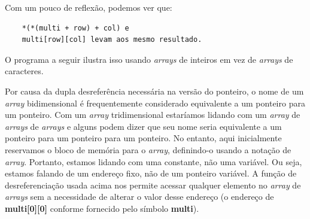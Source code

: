 Com um pouco de reflexão, podemos ver que:
\begin{lstlisting}
	*(*(multi + row) + col) e
	multi[row][col] levam aos mesmo resultado.
\end{lstlisting}

O programa a seguir ilustra isso usando \textit{arrays} de inteiros em vez de \textit{arrays} de caracteres.



Por causa da dupla desreferência necessária na versão do ponteiro, o nome de um \textit{array} bidimensional é frequentemente considerado equivalente a um ponteiro para um ponteiro. Com um \textit{array} tridimensional estaríamos lidando com um \textit{array} de \textit{arrays} de \textit{arrays} e alguns podem dizer que seu nome seria equivalente a um ponteiro para um ponteiro para um ponteiro. No entanto, aqui inicialmente reservamos o bloco de memória para o \textit{array}, definindo-o usando a notação de \textit{array}. Portanto, estamos lidando com uma constante, não uma variável. Ou seja, estamos falando de um endereço fixo, não de um ponteiro variável. A função de desreferenciação usada acima nos permite acessar qualquer elemento no \textit{array} de \textit{arrays} sem a necessidade de alterar o valor desse endereço (o endereço de \textbf{multi[0][0]} conforme fornecido pelo símbolo \textbf{multi}).
